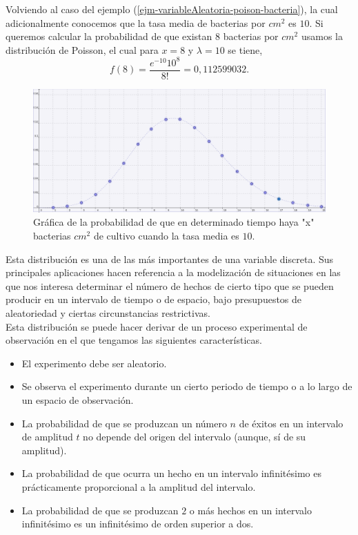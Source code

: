\begin{Ejm}
    Volviendo al caso del ejemplo (\ref{ejm-variableAleatoria-poison-bacteria}), la cual adicionalmente conocemos que la tasa media de bacterias por $cm^2$ es $10$. Si queremos calcular la probabilidad de que existan $8$ bacterias por $cm^2$ usamos la distribución de Poisson, el cual para $x=8$ y $\lambda = 10$ se tiene,
    $$f(8)=\frac{e^{-10} 10^{8}}{8!}=  0,112599032. $$ 
    \begin{figure}
        \includegraphics[width=15cm]{Cap1-Probabilidad/img/poisson.png}
        \caption{Gráfica de la probabilidad de que en determinado tiempo haya "x" bacterias $cm^2$ de cultivo cuando la tasa media es $10$.}
    \end{figure}
\end{Ejm}
Esta distribución es una de las más importantes de una variable discreta. Sus principales aplicaciones hacen referencia a la modelización de situaciones en las que nos interesa determinar el número de hechos de cierto tipo que se pueden producir en un intervalo de tiempo o de espacio, bajo presupuestos de aleatoriedad y ciertas circunstancias restrictivas.\\
Esta distribución se puede hacer derivar de un proceso experimental de observación en el que tengamos las siguientes características.
\begin{itemize}
    \item El experimento debe ser aleatorio.
    \item Se observa el experimento durante un cierto periodo de tiempo o a lo largo de un espacio de observación.
    \item La probabilidad de que se produzcan un número $n$ de éxitos en un intervalo de amplitud $t$ no depende del origen del intervalo (aunque, sí de su amplitud).
    \item La probabilidad de que ocurra un hecho en un intervalo infinitésimo es prácticamente proporcional a la amplitud del intervalo.
    \item La probabilidad de que se produzcan $2$ o más hechos en un intervalo infinitésimo es un infinitésimo de orden superior a dos.
\end{itemize}
